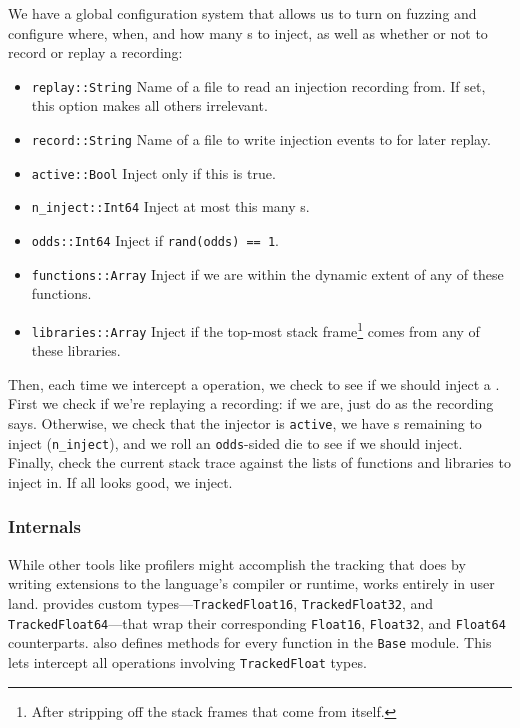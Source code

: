 \documentclass{juliacon}
\begin{document}
We have a global configuration system that allows us to turn on fuzzing and configure where, when, and how many \NaN{}s to inject, as well as whether or not to record or replay a recording:

\begin{itemize}
\item \texttt{replay::String} Name of a file to read an injection recording from. If set, this option makes all others irrelevant.
\item \texttt{record::String} Name of a file to write injection events to for later replay.
\item \texttt{active::Bool} Inject only if this is true.
\item \texttt{n\_inject::Int64} Inject at most this many \NaN{}s.
\item \texttt{odds::Int64} Inject if \texttt{rand(odds) == 1}.
\item \texttt{functions::Array} Inject if we are within the dynamic extent of any of these functions.
\item \texttt{libraries::Array} Inject if the top-most stack frame\footnote{After stripping off the stack frames that come from \FT{} itself.} comes from any of these libraries.
\end{itemize}

Then, each time we intercept a \fp{} operation, we check to see if we should inject a \NaN{}. First we check if we're replaying a recording: if we are, just do as the recording says. Otherwise, we check that the injector is \texttt{active}, we have \NaN{}s remaining to inject (\texttt{n\_inject}), and we roll an \texttt{odds}-sided die to see if we should inject. Finally, check the current stack trace against the lists of functions and libraries to inject in. If all looks good, we inject.

\subsubsection{\FT{} Internals}

While other tools like profilers might accomplish the tracking that \FT{} does by writing extensions to the language's compiler or runtime, \FT{} works entirely in user land.
\FT{} provides custom types---\texttt{TrackedFloat16}, \texttt{TrackedFloat32}, and \texttt{TrackedFloat64}---that wrap their corresponding \texttt{Float16}, \texttt{Float32}, and \texttt{Float64} counterparts.
\FT{} also defines methods for every function in the \texttt{Base} module.
This lets \FT{} intercept all \fp{} operations involving \texttt{TrackedFloat} types.
\end{document}
